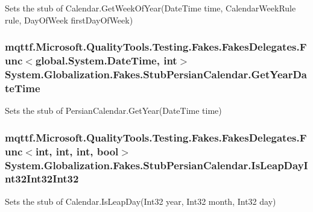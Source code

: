 Sets the stub of Calendar.\-Get\-Week\-Of\-Year(\-Date\-Time time, Calendar\-Week\-Rule rule, Day\-Of\-Week first\-Day\-Of\-Week)

\hypertarget{class_system_1_1_globalization_1_1_fakes_1_1_stub_persian_calendar_af07039010bdbe2e47bbbf1ec5b6cac75}{
\subsubsection[{Get\-Year\-Date\-Time}]{\setlength{\rightskip}{0pt plus 5cm}mqttf.\-Microsoft.\-Quality\-Tools.\-Testing.\-Fakes.\-Fakes\-Delegates.\-Func$<$global.\-System.\-Date\-Time, int$>$ System.\-Globalization.\-Fakes.\-Stub\-Persian\-Calendar.\-Get\-Year\-Date\-Time}}\label{class_system_1_1_globalization_1_1_fakes_1_1_stub_persian_calendar_af07039010bdbe2e47bbbf1ec5b6cac75}


Sets the stub of Persian\-Calendar.\-Get\-Year(\-Date\-Time time)

\hypertarget{class_system_1_1_globalization_1_1_fakes_1_1_stub_persian_calendar_a184e868dd60c78547bd7365e1327fe32}{
\subsubsection[{Is\-Leap\-Day\-Int32\-Int32\-Int32}]{\setlength{\rightskip}{0pt plus 5cm}mqttf.\-Microsoft.\-Quality\-Tools.\-Testing.\-Fakes.\-Fakes\-Delegates.\-Func$<$int, int, int, bool$>$ System.\-Globalization.\-Fakes.\-Stub\-Persian\-Calendar.\-Is\-Leap\-Day\-Int32\-Int32\-Int32}}\label{class_system_1_1_globalization_1_1_fakes_1_1_stub_persian_calendar_a184e868dd60c78547bd7365e1327fe32}


Sets the stub of Calendar.\-Is\-Leap\-Day(\-Int32 year, Int32 month, Int32 day)

